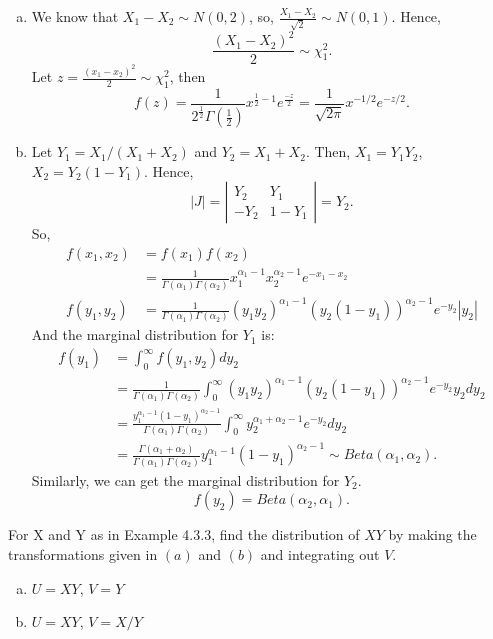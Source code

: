 \documentclass[14pt]{elegantbook}
\begin{document}
    \begin{solution}
        \begin{enumerate}[(a)]
            \item We know that $X_1-X_2\sim N(0,2)$, so, $\frac{X_1-X_2}{\sqrt{2}}\sim N(0,1)$. Hence, 
            \[\frac{(X_1-X_2)^2}{2}\sim\chi_1^2. \]
            Let $z=\frac{(x_1-x_2)^2}{2}\sim\chi_1^2$, then 
            \[f(z)={\frac {1}{2^{\frac {1}{2}}\Gamma ({\frac {1}{2}})}}x^{{\frac {1}{2}}-1}e^{\frac {-z}{2}}=\frac{1}{\sqrt{2\pi}}x^{-1/2}e^{-z/2}. \]
            \item Let $Y_1=X_1/(X_1+X_2)$ and $Y_2=X_1+X_2$. Then, $X_1=Y_1Y_2$, $X_2=Y_2(1-Y_1)$. Hence,
            \[|J|=\left|\begin{matrix}
                Y_2&Y_1\\
                -Y_2&1-Y_1
            \end{matrix}\right|=Y_2. \]
            So, \begin{align*}
                f(x_1,x_2)&=f(x_1)f(x_2)\\
                &=\frac{1}{\Gamma(\alpha_1)\Gamma(\alpha_2)}x_1^{\alpha_1-1}x_2^{\alpha_2-1}e^{-x_1-x_2}\\
                f(y_1,y_2)&=\frac{1}{\Gamma(\alpha_1)\Gamma(\alpha_2)}(y_1y_2)^{\alpha_1-1}(y_2(1-y_1))^{\alpha_2-1}e^{-y_2}|y_2|
            \end{align*}
            And the marginal distribution for $Y_1$ is: 
            \begin{align*}
                f(y_1)&=\int_0^\infty f(y_1,y_2)dy_2\\
                &=\frac{1}{\Gamma(\alpha_1)\Gamma(\alpha_2)}\int_0^\infty(y_1y_2)^{\alpha_1-1}(y_2(1-y_1))^{\alpha_2-1}e^{-y_2}y_2dy_2\\
                &=\frac{y_1^{\alpha_1-1}(1-y_1)^{\alpha_2-1}}{\Gamma(\alpha_1)\Gamma(\alpha_2)}\int_0^\infty y_2^{\alpha_1+\alpha_2-1}e^{-y_2}dy_2\\
                &=\frac{\Gamma(\alpha_1+\alpha_2)}{\Gamma(\alpha_1)\Gamma(\alpha_2)}y_1^{\alpha_1-1}(1-y_1)^{\alpha_2-1}\sim Beta(\alpha_1,\alpha_2). 
            \end{align*}
            Similarly, we can get the marginal distribution for $Y_2$.
            \[f(y_2)=Beta(\alpha_2, \alpha_1). \]
            
        \end{enumerate}
    \end{solution}

    \setcounter{exer}{22}
    \begin{exercise}
        For X and Y as in Example 4.3.3, find the distribution of $XY$ by making the transformations given in $(a)$ and $(b)$ and integrating out $V$. 
        \begin{enumerate}[(a)]
            \item $U= XY$, $V= Y$
            \item $U= XY$, $V = X/Y$
        \end{enumerate}
    \end{exercise}
\end{document}
